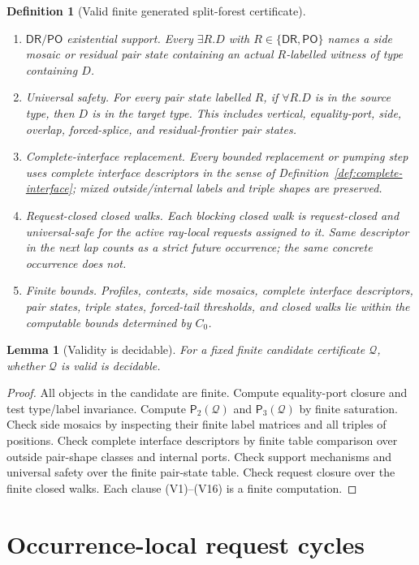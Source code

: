 \documentclass[11pt]{article}
\newtheorem{lemma}[theorem]{Lemma}
\newtheorem{definition}[theorem]{Definition}
\newcommand{\DR}{\mathsf{DR}}
\newcommand{\PO}{\mathsf{PO}}
\newcommand{\Q}{\mathcal Q}
\newcommand{\Pairs}{\mathsf P_2}
\newcommand{\Triples}{\mathsf P_3}
\begin{document}
\begin{definition}[Valid finite generated split-forest certificate]
\begin{enumerate}[label=(V\arabic*)]
\item \emph{$\DR/\PO$ existential support.}  Every $\exists R.D$ with $R\in\{\DR,\PO\}$ names a side mosaic or residual pair state containing an actual $R$-labelled witness of type containing $D$.
\item \emph{Universal safety.}  For every pair state labelled $R$, if $\forall R.D$ is in the source type, then $D$ is in the target type.  This includes vertical, equality-port, side, overlap, forced-splice, and residual-frontier pair states.
\item \emph{Complete-interface replacement.}  Every bounded replacement or pumping step uses complete interface descriptors in the sense of Definition~\ref{def:complete-interface}; mixed outside/internal labels and triple shapes are preserved.
\item \emph{Request-closed closed walks.}  Each blocking closed walk is request-closed and universal-safe for the active ray-local requests assigned to it.  Same descriptor in the next lap counts as a strict future occurrence; the same concrete occurrence does not.
\item \emph{Finite bounds.}  Profiles, contexts, side mosaics, complete interface descriptors, pair states, triple states, forced-tail thresholds, and closed walks lie within the computable bounds determined by $C_0$.
\end{enumerate}
\end{definition}

\begin{lemma}[Validity is decidable]\label{lem:validity-decidable}
For a fixed finite candidate certificate $\Q$, whether $\Q$ is valid is decidable.
\end{lemma}

\begin{proof}
All objects in the candidate are finite.  Compute equality-port closure and test type/label invariance.  Compute $\Pairs(\Q)$ and $\Triples(\Q)$ by finite saturation.  Check side mosaics by inspecting their finite label matrices and all triples of positions.  Check complete interface descriptors by finite table comparison over outside pair-shape classes and internal ports.  Check support mechanisms and universal safety over the finite pair-state table.  Check request closure over the finite closed walks.  Each clause (V1)--(V16) is a finite computation.
\end{proof}

\section{Occurrence-local request cycles}
\end{document}
